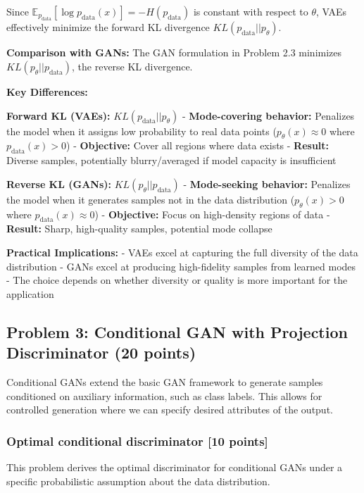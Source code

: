 \documentclass{article}
\begin{document}
Since $\mathbb{E}_{p_{\text{data}}} [\log p_{\text{data}}(x)] = -H(p_{\text{data}})$ is constant with respect to $\theta$, VAEs effectively minimize the forward KL divergence $KL(p_{\text{data}} || p_\theta)$.

\textbf{Comparison with GANs:} The GAN formulation in Problem 2.3 minimizes $KL(p_\theta || p_{\text{data}})$, the reverse KL divergence.

\textbf{Key Differences:}

\textbf{Forward KL (VAEs):} $KL(p_{\text{data}} || p_\theta)$
- \textbf{Mode-covering behavior:} Penalizes the model when it assigns low probability to real data points ($p_\theta(x) \approx 0$ where $p_{\text{data}}(x) > 0$)
- \textbf{Objective:} Cover all regions where data exists
- \textbf{Result:} Diverse samples, potentially blurry/averaged if model capacity is insufficient

\textbf{Reverse KL (GANs):} $KL(p_\theta || p_{\text{data}})$
- \textbf{Mode-seeking behavior:} Penalizes the model when it generates samples not in the data distribution ($p_\theta(x) > 0$ where $p_{\text{data}}(x) \approx 0$)
- \textbf{Objective:} Focus on high-density regions of data
- \textbf{Result:} Sharp, high-quality samples, potential mode collapse

\textbf{Practical Implications:}
- VAEs excel at capturing the full diversity of the data distribution
- GANs excel at producing high-fidelity samples from learned modes
- The choice depends on whether diversity or quality is more important for the application

\subsection{Problem 3: Conditional GAN with Projection Discriminator (20 points)}

Conditional GANs extend the basic GAN framework to generate samples conditioned on auxiliary information, such as class labels. This allows for controlled generation where we can specify desired attributes of the output.

\subsubsection{Optimal conditional discriminator [10 points]}

This problem derives the optimal discriminator for conditional GANs under a specific probabilistic assumption about the data distribution.
\end{document}
